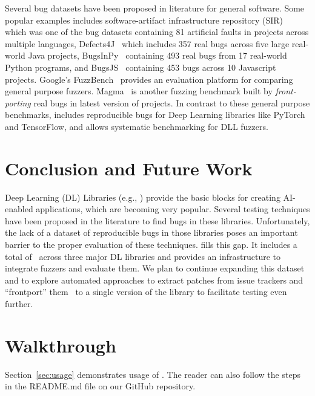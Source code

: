 \documentclass[sigconf,screen]{acmart}
\begin{document}
Several bug datasets have been proposed in literature for general
software. Some popular examples includes software-artifact
infrastructure repository (SIR)~\cite{do2005supporting} which was one
of the bug datasets containing 81 artificial faults in projects across
multiple languages, Defects4J~\cite{just2014defects4j} which includes
357 real bugs across five large real-world Java projects,
BugsInPy~\cite{widyasari2020bugsinpy} containing 493 real bugs from 17
real-world Python programs, and BugsJS~\cite{vancsics2020relationship}
containing 453 bugs across 10 Javascript projects.
%
Google's FuzzBench~\cite{metzman2021fuzzbench} provides an evaluation platform
for comparing general purpose fuzzers. Magma~\cite{hazimeh2020magma} is another
fuzzing benchmark built by \emph{front-porting} real bugs in latest version of
projects. In contrast to these general purpose benchmarks, \tname includes
reproducible bugs for Deep Learning libraries like PyTorch and TensorFlow, and
allows systematic benchmarking for DLL fuzzers. 


\section{Conclusion and Future Work}
Deep Learning (DL) Libraries (e.g., \torch) provide the basic blocks
for creating AI-enabled applications, which are becoming very
popular. Several testing techniques have been proposed in the
literature to find bugs in these libraries. Unfortunately, the lack of
a dataset of reproducible bugs in those libraries poses an important
barrier to the proper evaluation of these techniques. \tname{} fills
this gap. It includes a total of \numbugs\ across three major DL
libraries and provides an infrastructure to integrate fuzzers and
evaluate them. We plan to continue expanding this dataset and to
explore automated approaches to extract patches from issue trackers
and ``frontport'' them~\cite{hazimeh2020magma} to a single version of
the library to facilitate testing even further.

\balance



\appendix

\section{Walkthrough}

Section~\ref{sec:usage} demonstrates usage of \tname. The reader can
also follow the steps in the README.md file on our GitHub repository.
\end{document}

